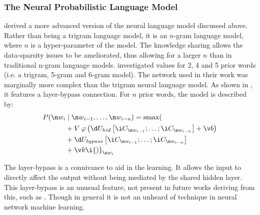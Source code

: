 {\subsubsection{The Neural Probabilistic Language Model}
 derived a more advanced version of the neural language model discussed above.
Rather than being a trigram language model, it is an $n$-gram language model, where $n$ is a hyper-parameter of the model.
The knowledge sharing allows the data-sparsity issues to be ameliorated, thus allowing for a larger $n$ than in traditional n-gram language models.
%
%
\textcite{NPLM} investigated values for 2, 4 and 5 prior words (i.e. a trigram, 5-gram and 6-gram model).
The network used in their work was marginally more complex than the trigram neural language model.
As shown in , it features a layer-bypass connection.
For $n$ prior words, the model is described by:
\begin{align}
P(\n w_i & \mid \n w_{i-1}, \ldots, \n w_{i-n}) = \softmax( \nonumber
\\  & + V \: \varphi\left( \d U_{hid} \left[\i C_{\n w_{i-1}};\ldots; \i C_{\n w_{i-n}} \right] + \v b\right) \nonumber
\\  & + \d U_{bypass} \left[ \i C_{\n w_{i-1}};\ldots; \i C_{\n w_{i-n}}\right] \nonumber
\\  & + \v k 
\i{)}_{\n w_i} %
\end{align}


The layer-bypass is a connivance to aid in the learning.
It allows the input to directly affect the output without being mediated by the shared hidden layer.
This layer-bypass is an unusual feature, not present in future works deriving from this, such as .
Though in general it is not an unheard of technique in neural network machine learning.


}

